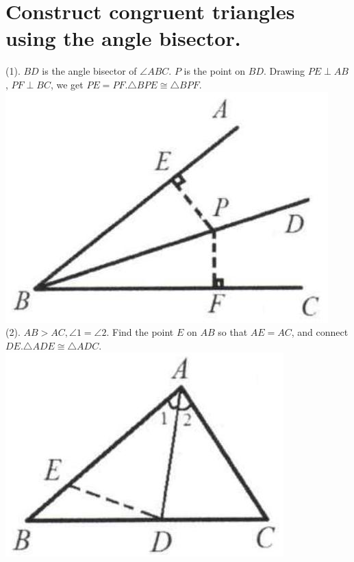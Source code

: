 \documentclass[10pt]{article}
\begin{document}
\section*{Construct congruent triangles using the angle bisector.}
(1). \(B D\) is the angle bisector of \(\angle A B C\). \(P\) is the point on \(B D\). Drawing \(P E \perp A B\), \(P F \perp B C\), we get \(P E=P F . \triangle B P E \cong \triangle B P F\).\\
\includegraphics[max width=\textwidth, center]{2025_04_17_97bc1f7e44d93c271a88g-054(1)}\\
(2). \(A B>A C, \angle 1=\angle 2\). Find the point \(E\) on \(A B\) so that \(A E=A C\), and connect \(D E . \triangle A D E \cong \triangle A D C\).\\
\includegraphics[max width=\textwidth, center]{2025_04_17_97bc1f7e44d93c271a88g-054}\\
\end{document}
